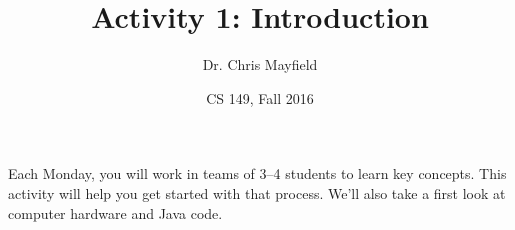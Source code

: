 \documentclass[11pt]{article}
\title{Activity 1: Introduction}
\author{Dr. Chris Mayfield}
\date{CS 149, Fall 2016}
\begin{document}
\maketitle

Each Monday, you will work in teams of 3--4 students to learn key concepts.
This activity will help you get started with that process.
We'll also take a first look at computer hardware and Java code.





\end{document}
